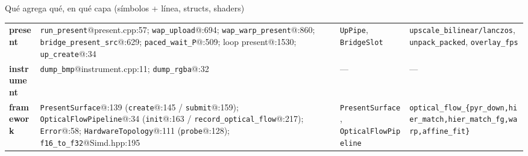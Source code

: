\documentclass[aspectratio=169]{beamer}
\newcommand{\Lpres}[1]{\textcolor{presCol}{\textbf{#1}}}
\newcommand{\Linst}[1]{\textcolor{instCol}{\textbf{#1}}}
\newcommand{\Lfw}[1]{\textcolor{fwCol}{\textbf{#1}}}
\begin{document}
\begin{frame}[allowframebreaks]{Qu\'e agrega qu\'e, en qu\'e capa (s\'imbolos + l\'inea, structs, shaders)}
\begin{longtable}{p{1.35cm} p{4.6cm} p{2.5cm} p{3.1cm}}
\Lpres{present} &
\texttt{run\_present}@present.cpp:57; \texttt{wap\_upload}@:694; \texttt{wap\_warp\_present}@:860; \texttt{bridge\_present\_src}@:629; \texttt{paced\_wait\_P}@:509; loop present@:1530; \texttt{up\_create}@:34 &
\texttt{UpPipe}, \texttt{BridgeSlot} &
\texttt{upscale\_bilinear/lanczos}, \texttt{unpack\_packed}, \texttt{overlay\_fps} \\

\Linst{instrument} &
\texttt{dump\_bmp}@instrument.cpp:11; \texttt{dump\_rgba}@:32 &
--- &
--- \\

\Lfw{framework} &
\texttt{PresentSurface}@:139 (\texttt{create}@:145 / \texttt{submit}@:159); \texttt{OpticalFlowPipeline}@:34 (\texttt{init}@:163 / \texttt{record\_optical\_flow}@:217); \texttt{Error}@:58; \texttt{HardwareTopology}@:111 (\texttt{probe}@:128); \texttt{f16\_to\_f32}@Simd.hpp:195 &
\texttt{PresentSurface}, \texttt{OpticalFlowPipeline} &
\texttt{optical\_flow\_\{pyr\_down,hier\_match,hier\_match\_fg,warp,affine\_fit\}} \\

\end{longtable}
\end{frame}
\end{document}
